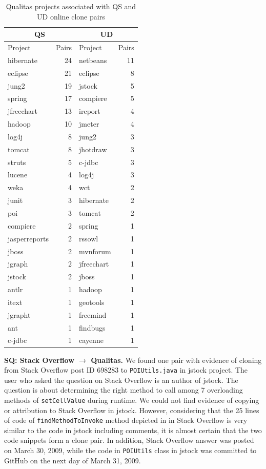 \documentclass[10pt,journal,compsoc]{IEEEtran}
\begin{document}
\begin{table}
	\centering
	\caption{Qualitas projects associated with QS and UD online clone pairs}
	\label{tab:qs_qualitas_projects}
	\begin{tabular}{lrlr}
		\toprule
		\multicolumn{2}{c}{QS} & \multicolumn{2}{c}{UD} \\
		\midrule
		Project & Pairs & Project & Pairs\\
		\midrule
		hibernate & 24 & netbeans & 11 \\
		eclipse & 21 & eclipse & 8 \\
		jung2 & 19 & jstock & 5 \\
		spring & 17 & compiere & 5 \\
		jfreechart & 13 & ireport & 4 \\
		hadoop & 10 & jmeter & 4 \\
		log4j & 8 & jung2 & 3 \\
		tomcat & 8 & jhotdraw & 3 \\
		struts & 5 & c-jdbc & 3 \\
		lucene & 4 & log4j & 3 \\
		weka & 4 & wct & 2 \\
		junit & 3 & hibernate & 2 \\
		poi & 3 & tomcat & 2 \\
		compiere & 2 & spring & 1 \\
		jasperreports & 2 & rssowl & 1 \\
		jboss & 2 & mvnforum & 1 \\
		jgraph & 2 & jfreechart & 1 \\
		jstock & 2 & jboss & 1 \\
		antlr & 1 & hadoop & 1 \\
		itext & 1 & geotools & 1 \\
		jgrapht & 1 & freemind & 1 \\
		ant & 1 & findbugs & 1 \\
		c-jdbc & 1 & cayenne & 1 \\
		\bottomrule
	\end{tabular} 
\end{table}

\textbf{SQ: Stack Overflow $\rightarrow$ Qualitas.} We found one pair with
evidence of cloning from Stack Overflow post ID 698283 to
{\small\texttt{POIUtils.java}} in \textsf{jstock} project. The user
 who asked the question on Stack Overflow is an author of
\textsf{jstock}. The question is about determining the right method to call
among 7 overloading methods of {\small\texttt{setCellValue}} during runtime. We
could not find evidence of copying or attribution to Stack Overflow in
\textsf{jstock}. However, considering that the 25 lines of code of
{\small\texttt{findMethodToInvoke}} method depicted in  in Stack
Overflow is very similar to the code in \textsf{jstock} including comments, it is almost certain that
the two code snippets form a clone pair. In addition, Stack Overflow answer was
posted on March 30, 2009, while the code in {\small\texttt{POIUtils}} class in
\textsf{jstock} was committed to GitHub on the next day of March 31, 2009.
\end{document}
